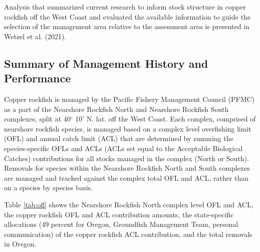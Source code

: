 \documentclass[11pt,
  english,
  a4paper,
]{article}
\begin{document}
\leavevmode\tagmcend\tagstructend\par


Analysis that summarized current research to inform stock structure in copper rockfish off the West Coast and evaluated the available information to guide the selection of the management area relative to the assessment area is presented in Wetzel et al. {(2021)\leavevmode\tagmcend\tagstructend}.

\leavevmode\tagmcend\tagstructend\par


\hypertarget{summary-of-management-history-and-performance}{%
\subsection{Summary of Management History and Performance}\label{summary-of-management-history-and-performance}}

\leavevmode\tagmcend\tagstructend


Copper rockfish is managed by the Pacific Fishery Management Council (PFMC) as a part of the Nearshore Rockfish North and Nearshore Rockfish South complexes, split at 40{\(^\circ\)\leavevmode\tagmcend\tagstructend} 10' N. lat. off the West Coast. Each complex, comprised of nearshore rockfish species, is managed based on a complex level overfishing limit (OFL) and annual catch limit (ACL) that are determined by summing the species-specific OFLs and ACLs (ACLs set equal to the Acceptable Biological Catches) contributions for all stocks managed in the complex (North or South). Removals for species within the Nearshore Rockfish North and South complexes are managed and tracked against the complex total OFL and ACL, rather than on a species by species basis.

\leavevmode\tagmcend\tagstructend\par


Table \ref{tab:ofl} shows the Nearshore Rockfish North complex level OFL and ACL, the copper rockfish OFL and ACL contribution amounts, the state-specific allocations (49 percent for Oregon, Groundfish Management Team, personal communication) of the copper rockfish ACL contribution, and the total removals in Oregon.
\end{document}
